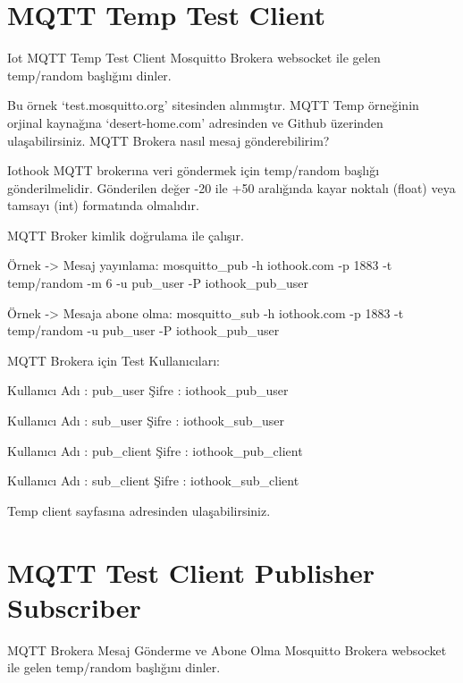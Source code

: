 \documentclass[letterpaper,10pt,turkish]{sphinxmanual}
\begin{document}
\section{MQTT Temp Test Client}
\label{\detokenize{mqtt-temp-test-client::doc}}\label{\detokenize{mqtt-temp-test-client:mqtt-temp-test-client}}\label{\detokenize{mqtt-temp-test-client:id1}}
Iot MQTT Temp Test Client
Mosquitto Brokera websocket ile gelen temp/random başlığını dinler.

Bu örnek `test.mosquitto.org' sitesinden alınmıştır. MQTT Temp örneğinin orjinal kaynağına `desert-home.com' adresinden ve Github üzerinden ulaşabilirsiniz.
MQTT Brokera nasıl mesaj gönderebilirim?

Iothook MQTT brokerına veri göndermek için \sphinxquotedblleft{}temp/random\sphinxquotedblright{} başlığı gönderilmelidir. Gönderilen değer -20 ile +50 aralığında kayar noktalı (float) veya tamsayı (int) formatında olmalıdır.

MQTT Broker kimlik doğrulama ile çalışır.

Örnek -\textgreater{} Mesaj yayınlama: mosquitto\_pub -h iothook.com -p 1883 -t \sphinxquotedblleft{}temp/random\sphinxquotedblright{} -m \sphinxquotedblleft{}6\sphinxquotedblright{} -u pub\_user -P iothook\_pub\_user

Örnek -\textgreater{} Mesaja abone olma: mosquitto\_sub -h iothook.com -p 1883 -t \sphinxquotedblleft{}temp/random\sphinxquotedblright{} -u pub\_user -P iothook\_pub\_user

MQTT Brokera için Test Kullanıcıları:

Kullanıcı Adı : pub\_user Şifre : iothook\_pub\_user

Kullanıcı Adı : sub\_user Şifre : iothook\_sub\_user

Kullanıcı Adı : pub\_client Şifre : iothook\_pub\_client

Kullanıcı Adı : sub\_client Şifre : iothook\_sub\_client
\begin{figure}[htbp]
\centering
\capstart

\noindent{}
\caption{}\label{\detokenize{mqtt-temp-test-client:id2}}\end{figure}

Temp client sayfasına
adresinden ulaşabilirsiniz.


\section{MQTT Test Client Publisher Subscriber}
\label{\detokenize{mqtt-temp-test-client-publisher-subscriber:mqtt-temp-test-client-publisher-subscriber}}\label{\detokenize{mqtt-temp-test-client-publisher-subscriber::doc}}\label{\detokenize{mqtt-temp-test-client-publisher-subscriber:mqtt-test-client-publisher-subscriber}}
MQTT Brokera Mesaj Gönderme ve Abone Olma
Mosquitto Brokera websocket ile gelen temp/random başlığını dinler.
\end{document}
